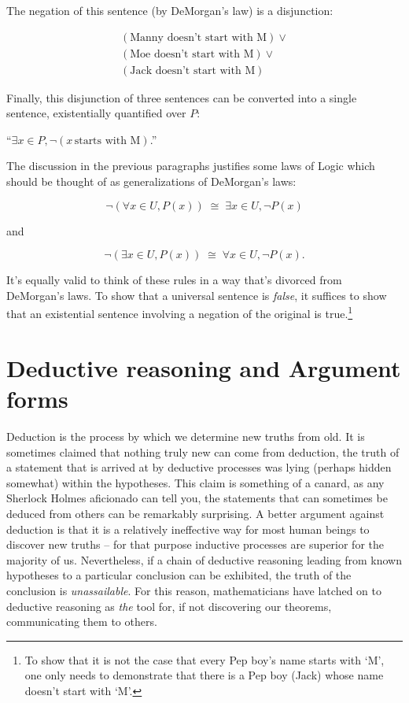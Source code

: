 \noindent  The negation
of this sentence (by DeMorgan's law) is a disjunction:

\begin{gather*}
(\mbox{Manny doesn't start with M}) \lor \\ 
(\mbox{Moe doesn't start with M}) \lor \\
(\mbox{Jack doesn't start with M})
\end{gather*}

\noindent Finally, this disjunction of three sentences can be converted into 
a single sentence, existentially quantified over $P$:

``$\exists x \in P, {\lnot}(x \, \mbox{starts with M})$.'' 

The discussion in the previous paragraphs justifies some laws of 
Logic which should be thought of as generalizations of DeMorgan's laws:

\[ 
{\lnot}( \forall x \in U, P(x)) \; \cong \; \exists x \in U, {\lnot}P(x)
\]

\noindent and

\[ 
{\lnot}( \exists x \in U, P(x)) \; \cong \; \forall x \in U, {\lnot}P(x).
\]

It's equally valid to think of these rules in a way that's divorced from
DeMorgan's laws.  To show that a universal sentence is {\em false}, it suffices
to show that an existential sentence involving a negation of the original is 
true.\footnote{To show that it is not the case that every Pep boy's name starts
with `M', one only needs to demonstrate that there is a Pep boy (Jack) whose 
name doesn't start with `M'.}

\clearpage





\newpage

\section{Deductive reasoning and Argument forms}
\label{sec:deduct}

Deduction 
is the process by which we determine new truths from old.  
It is sometimes claimed that nothing truly new can come from deduction, 
the truth of a statement that is arrived at by deductive processes was 
lying (perhaps hidden somewhat) within the hypotheses.  This claim is something
of a canard, as any Sherlock Holmes aficionado can tell you, the statements
that can sometimes be deduced from others can be remarkably surprising.  
A better
argument against deduction is that it is a relatively ineffective way for most 
human beings to discover new truths -- for that purpose inductive processes are
superior for the majority of us.  Nevertheless, if a chain of deductive reasoning
leading from known hypotheses to a particular conclusion can be exhibited, the truth
of the conclusion is \emph{unassailable}.  For this reason, mathematicians have 
latched on to deductive reasoning as \emph{the} tool for, if not discovering 
our theorems, communicating them to others.  

